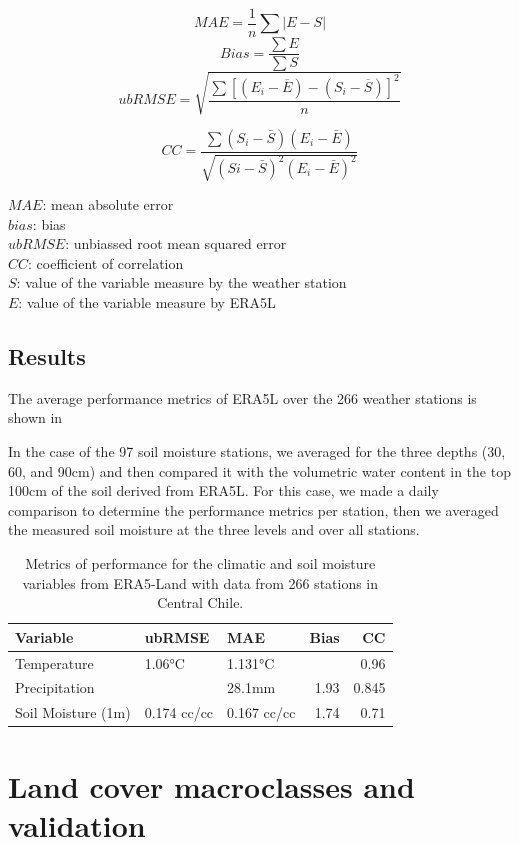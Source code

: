 \documentclass[
  authoryear,
  preprint,
  3p,
  onecolumn]{elsarticle}
\begin{document}
\[MAE = \frac{1}{n}\sum |{E-S}|\] \[Bias = \frac{\sum E}{\sum S}\]
\[ubRMSE =\sqrt{\frac{\sum{ \left[ (E_i-\overline{E})-(S_i-\overline{S}) \right ] ^2}}{n}}\]

\[CC = \frac{\sum (S_i-\bar{S})(E_i-\bar{E})}{\sqrt{(Si-\bar{S})^2(E_i-\bar{E})^2}}\]

\(MAE\): mean absolute error\\
\(bias\): bias\\
\(ubRMSE\): unbiassed root mean squared error\\
\(CC\): coefficient of correlation\\
\(S\): value of the variable measure by the weather station\\
\(E\): value of the variable measure by ERA5L

\hypertarget{results}{%
\subsection{Results}\label{results}}

The average performance metrics of ERA5L over the 266 weather stations
is shown in \citet{table_metrics_era5}

In the case of the 97 soil moisture stations, we averaged for the three
depths (30, 60, and 90cm) and then compared it with the volumetric water
content in the top 100cm of the soil derived from ERA5L. For this case,
we made a daily comparison to determine the performance metrics per
station, then we averaged the measured soil moisture at the three levels
and over all stations.

\begin{longtable}{lllrr}
\caption{Metrics of performance for the climatic and soil moisture variables from
ERA5-Land with data from 266 stations in Central Chile.}\tabularnewline

\toprule
Variable & ubRMSE & MAE & Bias & CC \\ 
\midrule\addlinespace[2.5pt]
Temperature & 1.06°C & 1.131°C &  & 0.96 \\ 
Precipitation &  & 28.1mm & 1.93 & 0.845 \\ 
Soil Moisture (1m) & 0.174 cc/cc & 0.167 cc/cc & 1.74 & 0.71 \\ 
\bottomrule
\end{longtable}

\hypertarget{land-cover-macroclasses-and-validation}{%
\section{Land cover macroclasses and
validation}\label{land-cover-macroclasses-and-validation}}
\end{document}
